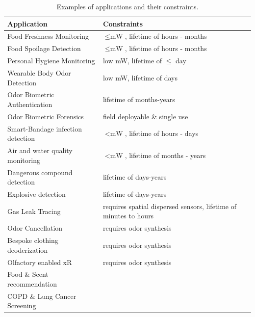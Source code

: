 \begin{table}[]
\caption{Examples of \olfc{} applications and their constraints.}
\label{tab:applications}
\begin{adjustbox}{max width=\linewidth}
\begin{tabular}{@{}ll@{}}
\toprule
\textbf{Application}              & \textbf{Constraints}     \\ \midrule
Food Freshness Monitoring         & \(\leq\si{\milli\watt}\), lifetime of hours - months \\
Food Spoilage Detection           & \(\leq\si{\milli\watt}\), lifetime of hours - months \\
Personal Hygiene Monitoring       & low \si{\milli\watt}, lifetime of $\leq$ day         \\
Wearable Body Odor Detection      & low \si{\milli\watt}, lifetime of days               \\
Odor Biometric Authentication     & lifetime of months-years                             \\
Odor Biometric Forensics          & field deployable \& single use                       \\
Smart-Bandage infection detection & \(<\si{\milli\watt}\), lifetime of hours - days      \\
Air and water quality monitoring  & \(<\si{\milli\watt}\), lifetime of months - years    \\
Dangerous compound detection      & lifetime of days-years                               \\
Explosive detection               & lifetime of days-years                               \\
Gas Leak Tracing                  & requires spatial dispersed sensors, lifetime of minutes to hours \\
Odor Cancellation                 & requires odor synthesis  \\
Bespoke clothing deoderization    & requires odor synthesis  \\
Olfactory enabled xR              & requires odor synthesis \\
Food \& Scent recommendation      &                          \\
COPD \& Lung Cancer Screening     &                          \\
    \bottomrule
\end{tabular}
\end{adjustbox}
\end{table}


